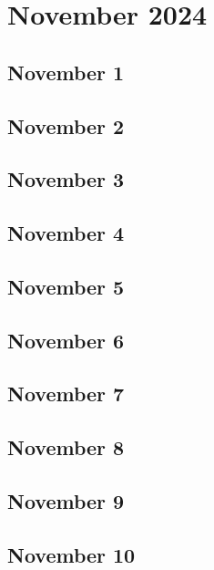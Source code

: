 %
%
%

\chapter{November 2024}
\label{intro} %

\section{November 1}

\section{November 2}

\section{November 3}

\section{November 4}

\section{November 5}

\section{November 6}

\section{November 7}

\section{November 8}

\section{November 9}

\section{November 10}

